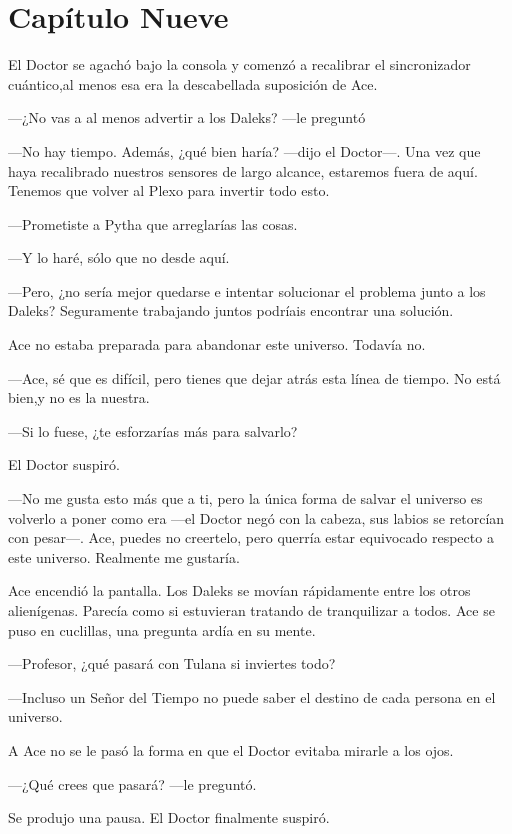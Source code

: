 \chapter*{Capítulo Nueve}

El Doctor se agachó bajo la consola y comenzó a recalibrar el
sincronizador cuántico,al menos esa era la descabellada suposición de
Ace.

---¿No vas a al menos advertir a los Daleks? ---le preguntó

---No hay tiempo. Además, ¿qué bien haría? ---dijo el Doctor---.
Una vez que haya recalibrado nuestros sensores de largo alcance,
estaremos fuera de aquí. Tenemos que volver al Plexo para invertir todo
esto.

---Prometiste a Pytha que arreglarías las cosas.

---Y lo haré, sólo que no desde aquí.

---Pero, ¿no sería mejor quedarse e intentar solucionar el
problema junto a los Daleks? Seguramente trabajando juntos podríais
encontrar una solución.

Ace no estaba preparada para abandonar este universo. Todavía
no.

---Ace, sé que es difícil, pero tienes que dejar atrás esta
línea de tiempo. No está bien,y no es la nuestra.

---Si lo fuese, ¿te esforzarías más para salvarlo?

El Doctor suspiró.

---No me gusta esto más que a ti, pero la única forma de salvar
el universo es volverlo a poner como era ---el Doctor negó con la
cabeza, sus labios se retorcían con pesar---. Ace, puedes no creertelo,
pero querría estar equivocado respecto a este universo. Realmente me
gustaría.

Ace encendió la pantalla. Los Daleks se movían rápidamente entre
los otros alienígenas. Parecía como si estuvieran tratando de
tranquilizar a todos. Ace se puso en cuclillas, una pregunta ardía en su
mente.

---Profesor, ¿qué pasará con Tulana si inviertes todo?

---Incluso un Señor del Tiempo no puede saber el destino de cada
persona en el universo.

A Ace no se le pasó la forma en que el Doctor evitaba mirarle a
los ojos.

---¿Qué crees que pasará? ---le preguntó.

Se produjo una pausa. El Doctor finalmente suspiró.

